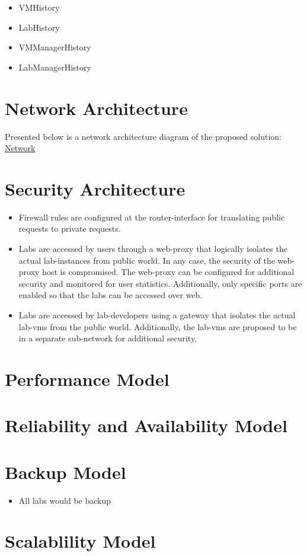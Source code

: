 \documentclass[11pt]{article}
\begin{document}
\begin{itemize}
\item VMHistory
\item LabHistory
\item VMManagerHistory
\item LabManagerHistory
\end{itemize}
\section{Network Architecture}
\label{sec-5}

  Presented below is a network architecture diagram of the proposed
  solution:
   \href{file://../network-infrastructure.jpg }{Network}

\section{Security Architecture}
\label{sec-6}


\begin{itemize}
\item Firewall rules are configured at the router-interface for
    translating public requests to private requests.
\item Labs are accessed by users through a web-proxy that logically
    isolates the actual lab-instances from public world. In any case,
    the security of the web-proxy host is compromised. The web-proxy
    can be configured for additional security and monitored for user
    statistics. Additionally, only specific ports are enabled so that
    the labs can be accessed over web.
\item Labs are accessed by lab-developers using a gateway that isolates
    the actual lab-vms from the public world. Additionally, the
    lab-vms are proposed to be in a separate sub-network for
    additional security.
\end{itemize}
\section{Performance Model}
\label{sec-7}

\section{Reliability and Availability Model}
\label{sec-8}

\section{Backup Model}
\label{sec-9}

\begin{itemize}
\item All labs would be backup
\end{itemize}
\section{Scalablility Model}
\label{sec-10}
\end{document}

